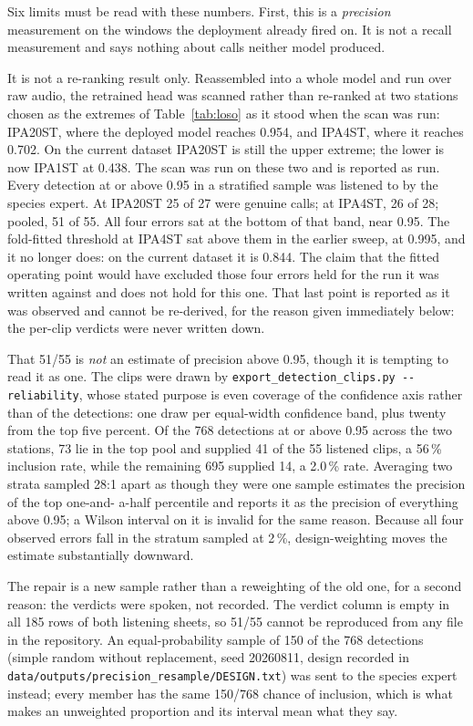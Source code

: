 \documentclass[review,3p,times]{elsarticle}
\begin{document}
Six limits must be read with these numbers.
First, this is a \emph{precision} measurement on the windows the deployment
already fired on. It is not a recall measurement and says nothing about calls
neither model produced.

It is not a re-ranking result only. Reassembled into a whole model and run over
raw audio, the
retrained head was scanned rather than re-ranked at two stations chosen as the
extremes of Table~\ref{tab:loso} as it stood when the scan was run: IPA20ST,
where the deployed model reaches 0.954, and IPA4ST, where it reaches 0.702.
On the current dataset IPA20ST is still the upper extreme; the lower is now
IPA1ST at 0.438. The scan was run on these two and is reported as run.
Every detection at or above 0.95 in a
stratified sample was listened to by the species expert. At IPA20ST 25 of 27
were genuine calls; at IPA4ST, 26 of 28; pooled, 51 of 55. All four errors sat
at the bottom of that band, near 0.95. The fold-fitted threshold at IPA4ST sat
above them in the earlier sweep, at 0.995, and it no longer does: on the current
dataset it is 0.844. The claim that the fitted operating point would have
excluded those four errors held for the run it was written against and does not
hold for this one.
That last point is reported as it was observed and cannot be re-derived, for the
reason given immediately below: the per-clip verdicts were never written down.

That 51/55 is \emph{not} an estimate of precision above 0.95, though it is
tempting to read it as one. The clips were drawn by
\texttt{export\_detection\_clips.py -{}-reliability}, whose stated purpose is
even coverage of the confidence axis rather than of the detections: one draw per
equal-width confidence band, plus twenty from the top five percent. Of the 768
detections at or above 0.95 across the two stations, 73 lie in the top pool and
supplied 41 of the 55 listened clips, a 56\,\% inclusion rate, while the
remaining 695 supplied 14, a 2.0\,\% rate. Averaging two strata sampled 28:1
apart as though they were one sample estimates the precision of the top one-and-
a-half percentile and reports it as the precision of everything above 0.95; a
Wilson interval on it is invalid for the same reason. Because all four observed
errors fall in the stratum sampled at 2\,\%, design-weighting moves the estimate
substantially downward.

The repair is a new sample rather than a reweighting of the old one, for a
second reason: the verdicts were spoken, not recorded. The verdict column is
empty in all 185 rows of both listening sheets, so 51/55 cannot be reproduced
from any file in the repository. An equal-probability sample of 150 of the 768
detections (simple random without replacement, seed 20260811, design recorded in
\texttt{data/outputs/precision\_resample/DESIGN.txt}) was sent to the species
expert instead; every member has the same 150/768 chance of inclusion, which is what makes an
unweighted proportion and its interval mean what they say.
\end{document}
